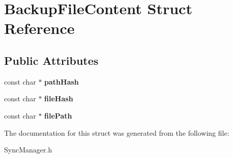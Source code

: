 \hypertarget{structBackupFileContent}{\section{Backup\-File\-Content Struct Reference}
\label{structBackupFileContent}
}
\subsection*{Public Attributes}
\begin{DoxyCompactItemize}
\item 
\hypertarget{structBackupFileContent_a9f970133d4285b0095314bba7bb95a34}{const char $\ast$ {\bfseries path\-Hash}}\label{structBackupFileContent_a9f970133d4285b0095314bba7bb95a34}

\item 
\hypertarget{structBackupFileContent_afc617ce78fb9fb60d9449e4775443b04}{const char $\ast$ {\bfseries file\-Hash}}\label{structBackupFileContent_afc617ce78fb9fb60d9449e4775443b04}

\item 
\hypertarget{structBackupFileContent_a93993bcf021d1d6aa7fd7c0ef1304461}{const char $\ast$ {\bfseries file\-Path}}\label{structBackupFileContent_a93993bcf021d1d6aa7fd7c0ef1304461}

\end{DoxyCompactItemize}


The documentation for this struct was generated from the following file\-:\begin{DoxyCompactItemize}
\item 
Sync\-Manager.\-h\end{DoxyCompactItemize}

